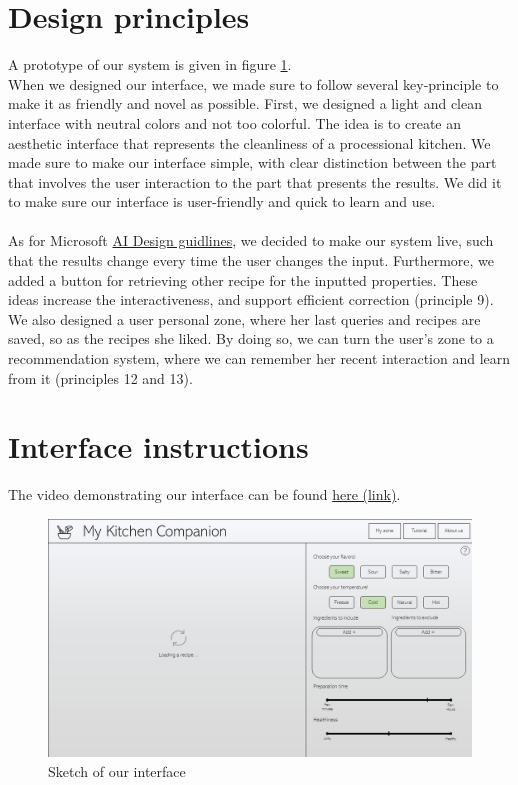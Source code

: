 \documentclass[]{article}
\begin{document}
\section{Design principles}
A prototype of our system is given in figure \ref{fig:interface-sketch}.\\
When we designed our interface, we made sure to follow several key-principle to make it as friendly and novel as possible. First, we designed a light and clean interface with neutral colors and not too colorful. The idea is to create an aesthetic interface that represents the cleanliness of a processional kitchen. We made sure to make our interface simple, with clear distinction between the part that involves the user interaction to the part that presents the results. We did it to make sure our interface is user-friendly and quick to learn and use. \\
\\
As for Microsoft \href{https://www.microsoft.com/en-us/haxtoolkit/uploads/prod/2021/05/AI-Design-guidelines_041519.pdf}{AI Design guidlines}, we decided to make our system live, such that the results change every time the user changes the input. Furthermore, we added a button for retrieving other recipe for the inputted properties. These ideas increase the interactiveness, and support efficient correction (principle 9). We also designed a user personal zone, where her last queries and recipes are saved, so as the recipes she liked. By doing so, we can turn the user's zone to a recommendation system, where we can remember her recent interaction and learn from it (principles 12 and 13).
\pagebreak
\section{Interface instructions}
The video demonstrating our interface can be found \href{https://technion.zoom.us/rec/share/PU1TB-U-57yZRVwj-nYYAOn9mz1jJn3S6KXnJIA6HyUzOYlgKXx_yGTjYEwseBtB.GnT92OwZw5YGS-gp}{here (link)}. \\
\begin{figure}[H]
	\centering
	\includegraphics[width=0.7\linewidth]{"../Interface sketch/Interface sketch"}
	\caption[s]{Sketch of our interface}
	\label{fig:interface-sketch}
\end{figure}
\end{document}
